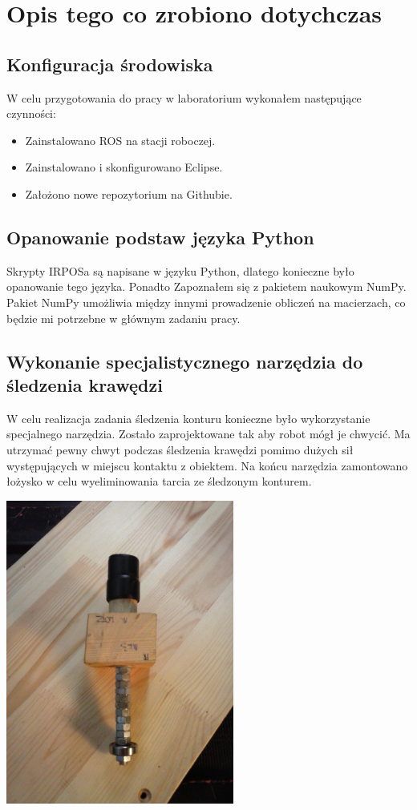 \documentclass[12pt, a4paper, twoside]{book}
\begin{document}
\chapter{Opis tego co zrobiono dotychczas}
	\section{Konfiguracja środowiska}
	W celu przygotowania do pracy w laboratorium wykonałem następujące czynności:
		\begin{itemize}
			\item Zainstalowano ROS na stacji roboczej.
			\item Zainstalowano i skonfigurowano Eclipse.
			\item Założono nowe repozytorium na Githubie.
		\end{itemize}		
	\section{Opanowanie podstaw języka Python}
	Skrypty IRPOSa są napisane w języku Python, dlatego konieczne było opanowanie tego języka. Ponadto Zapoznałem się z pakietem naukowym NumPy. Pakiet NumPy umożliwia między innymi prowadzenie obliczeń na macierzach, co będzie mi potrzebne w głównym zadaniu pracy.
	\section{Wykonanie specjalistycznego narzędzia do śledzenia krawędzi}
	W celu realizacja zadania śledzenia konturu konieczne było wykorzystanie specjalnego narzędzia. Zostało zaprojektowane tak aby robot mógł je chwycić. Ma utrzymać pewny chwyt podczas śledzenia krawędzi pomimo dużych sił występujących w miejscu kontaktu z obiektem. Na końcu narzędzia zamontowano łożysko w celu wyeliminowania tarcia ze śledzonym konturem.
	
	\includegraphics[width=7.5cm,height=10cm]{images/MK3.jpg}
	
\end{document}
